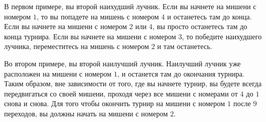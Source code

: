 В первом примере, вы второй наихудший лучник. Если вы начнете на мишени с номером $1$, то вы попадете на мишень с номером $4$ и останетесь там до конца. Если вы начнете на мишени с номером $2$ или $4$, вы просто останетесь там до конца турнира. Если вы начнете на мишени с номером $3$, то победите наихудшего лучника, переместитесь на мишень с номером $2$ и там останетесь.

Во втором примере, вы второй наилучший лучник. Наилучший лучник уже расположен на мишени с номером $1$, и останется там до окончания турнира. Таким образом, вне зависимости от того, где вы начнете турнир, вы будете всегда передвигаться со своей мишени, проходя через все мишени с номерами от $4$ до $1$ снова и снова. Для того чтобы окончить турнир на мишени с номером $1$ после $9$ переходов, вы должны начать на мишени с номером $2$.